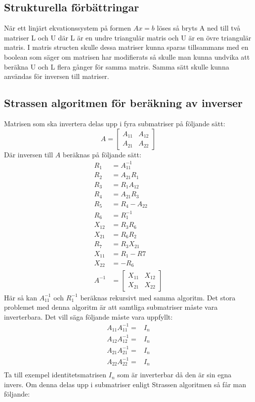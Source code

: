 \subsection{Strukturella förbättringar}
När ett linjärt ekvationssystem på formen $Ax=b $ löses så bryts A ned till två matriser L och U där L är en undre triangulär matris och U är en övre triangulär matris\cite{Ching}. I matris structen skulle dessa matriser kunna sparas tillsammans med en boolean som säger om matrisen har modifierats så skulle man kunna undvika att beräkna U och L flera gånger för samma matris. Samma sätt skulle kunna användas för inversen till matriser. 

\subsection{Strassen algoritmen för beräkning av inverser}
\label{sec:inverse_nackdelar}
Matrisen som ska invertera delas upp i fyra submatriser på följande sätt:
$$A=\begin{bmatrix}
A_{11} & A_{12} \\
A_{21}& A_{22}
 \end{bmatrix}
 $$
 Där inversen till $A$ beräknas på följande sätt\cite{Petkovic2013}:
 \begin{align}
  R_1 & =A_{11}^{-1} \\
  R_2 & =A_{21}R_1 \\
  R_3 & =R_1A_{12} \\
  R_4 & =A_{21}R_3 \\
  R_5 & =R_4 -A_{22} \\
  R_6 & =R_1^{-1} \\
  X_{12} & =R_3R_6 \\
  X_{21} & =R_6R_2 \\
  R_7 & =R_3X_{21} \\
  X_{11} & =R_1 -R7 \\
  X_{22} & =-R_6 \\
 A^{-1} & =\begin{bmatrix}
X_{11} & X_{12} \\
X_{21}& X_{22}
 \end{bmatrix}
 \end{align}
 Här så kan $A_{11}^{-1}$ och $R_1^{-1}$ beräknas rekursivt med samma algoritm. Det stora problemet med denna algoritm är att samtliga submatriser måste vara inverterbara. Det vill säga följande måste vara uppfyllt:
 \begin{align}
   A_{11}A_{11}^{-1}= & I_n \\
   A_{12}A_{12}^{-1}= & I_n \\
   A_{21}A_{21}^{-1}= & I_n \\
   A_{22}A_{22}^{-1}= & I_n \\
 \end{align}
 Ta till exempel identitetsmatrisen $I_n$ som är inverterbar då den är sin egna invers. Om denna delas upp i submatriser enligt Strassen algoritmen så får man följande:
 
